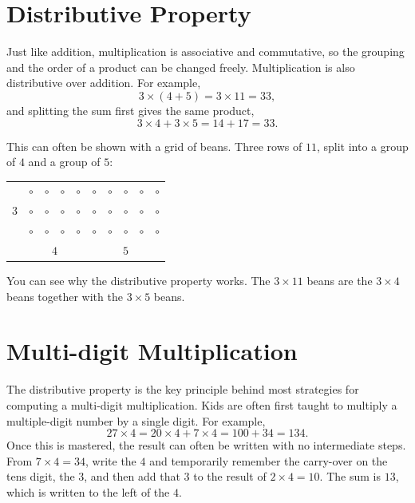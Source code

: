 \section{Distributive Property}

Just like addition, multiplication is associative and commutative, so the grouping and the order of a product can be changed freely. Multiplication is also distributive over addition. For example,
\[
  3 \times (4 + 5) = 3 \times 11 = 33,
\]
and splitting the sum first gives the same product,
\[
  3 \times 4 + 3 \times 5 = 14 + 17 = 33.
\]

This can often be shown with a grid of beans. Three rows of $11$, split into a group of $4$ and a group of $5$:
\begin{center}
\setlength{\tabcolsep}{0.65em}
\renewcommand{\arraystretch}{1.35}
\begin{tabular}{c|c|c|c|c!{\vrule width 1.2pt}c|c|c|c|c|}
& $\circ$ & $\circ$ & $\circ$ & $\circ$ & $\circ$ & $\circ$ & $\circ$ & $\circ$ & $\circ$ \\
$3$ & $\circ$ & $\circ$ & $\circ$ & $\circ$ & $\circ$ & $\circ$ & $\circ$ & $\circ$ & $\circ$ \\
& $\circ$ & $\circ$ & $\circ$ & $\circ$ & $\circ$ & $\circ$ & $\circ$ & $\circ$ & $\circ$ \\
 &  & 
\end{tabular}
\end{center}
You can see why the distributive property works. The $3 \times 11$ beans are the $3 \times 4$ beans together with the $3 \times 5$ beans.

\section{Multi-digit Multiplication}

The distributive property is the key principle behind most strategies for computing a multi-digit multiplication. Kids are often first taught to multiply a multiple-digit number by a single digit. For example,
\[
  27 \times 4 = 20 \times 4 + 7 \times 4 = 100 + 34 = 134.
\]
Once this is mastered, the result can often be written with no intermediate steps. From $7 \times 4 = 34$, write the $4$ and temporarily remember the carry-over on the tens digit, the $3$, and then add that $3$ to the result of $2 \times 4 = 10$. The sum is $13$, which is written to the left of the $4$.

